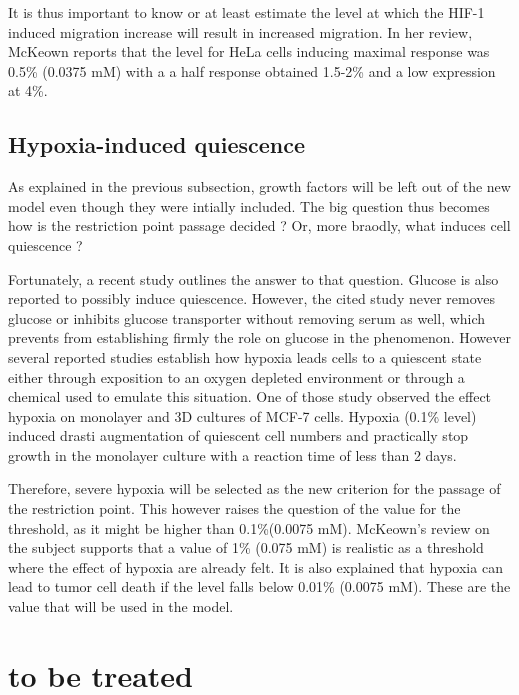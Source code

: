\documentclass[11pt,a4paper]{article}
\begin{document}
It is thus important to know or at least estimate the level at which the HIF-1 induced migration increase will result in increased migration. In her review, McKeown reports that the level for HeLa cells inducing maximal response was 0.5\% (0.0375 mM) with a a half response obtained 1.5-2\% and a low expression at 4\%.\cite{McKeown2014}

\subsection{Hypoxia-induced quiescence}
As explained in the previous subsection, growth factors will be left out of the new model even though they were intially included. The big question thus becomes how is the restriction point passage decided ? Or, more braodly, what induces cell quiescence ?

Fortunately, a recent study outlines the answer to that question.\cite{Nabil2021} Glucose is also reported to possibly induce quiescence. However, the cited study never removes glucose or inhibits glucose transporter without removing serum as well, which prevents from establishing firmly the role on glucose in the phenomenon.\cite{Hu2011}
However several reported studies establish how hypoxia leads cells to a quiescent state either through exposition to an oxygen depleted environment or through a chemical used to emulate this situation.\cite{Nabil2021} One of those study observed the effect hypoxia on monolayer and 3D cultures of MCF-7 cells. Hypoxia (0.1\% level) induced drasti augmentation of quiescent cell numbers and practically stop growth in the monolayer culture with a reaction time of less than 2 days.\cite{Lee2018}

Therefore, severe hypoxia will be selected as the new criterion for the passage of the restriction point. This however raises the question of the value for the threshold, as it might be higher than 0.1\%(0.0075 mM). McKeown's review on the subject supports that a value of 1\% (0.075 mM)  is realistic as a threshold where the effect of hypoxia are already felt. It is also explained that hypoxia can lead to tumor cell death if the level falls below 0.01\% (0.0075 mM).\cite{McKeown2014} These are the value that will be used in the model.



\section*{to be treated}
\end{document}
